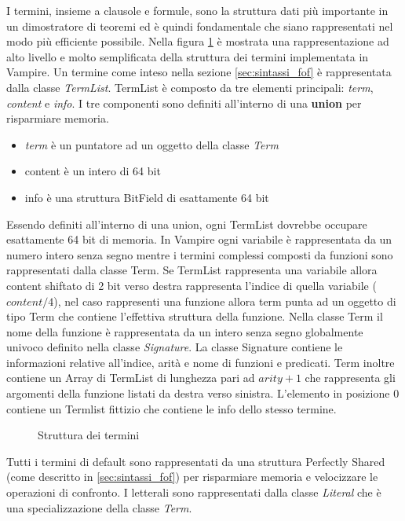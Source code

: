 \documentclass[./main.tex]{subfiles}
\begin{document}
I termini, insieme a clausole e formule, sono la struttura dati più importante in un dimostratore di teoremi ed è quindi fondamentale
che siano rappresentati nel modo più efficiente possibile. 
Nella figura \ref{fig:vampire_terms} è mostrata una rappresentazione ad alto 
livello e molto semplificata della struttura dei termini implementata in Vampire.
Un termine come inteso nella sezione \ref{sec:sintassi_fof} è rappresentata dalla classe \textit{TermList}.
TermList è composto da tre elementi principali: \textit{term}, \textit{content} e \textit{info}.
I tre componenti sono definiti all'interno di una \textbf{union} per risparmiare memoria.
\begin{itemize}
    \item \textit{term} è un puntatore ad un oggetto della classe \textit{Term}
    \item content è un intero di 64 bit
    \item info è una struttura BitField di esattamente 64 bit
\end{itemize}
Essendo definiti all'interno di una union, ogni TermList dovrebbe occupare esattamente 64 bit di memoria.
In Vampire ogni variabile è rappresentata da un numero intero senza segno mentre i termini complessi
composti da funzioni sono rappresentati dalla classe Term. 
Se TermList rappresenta una variabile allora content shiftato di 2 bit verso destra rappresenta l'indice di quella variabile ($content/4$),
nel caso rappresenti una funzione allora term punta ad un oggetto di tipo Term che contiene l'effettiva struttura della funzione.
Nella classe Term il nome della funzione è rappresentata da un intero senza segno globalmente univoco definito nella classe \textit{Signature}.
La classe Signature contiene le informazioni relative all'indice, arità e nome di funzioni e predicati. 
Term inoltre contiene un Array di TermList di lunghezza pari ad $arity+1$ che rappresenta gli argomenti della funzione listati 
da destra verso sinistra. L'elemento in posizione 0 contiene un Termlist fittizio che contiene le info dello stesso termine.
\begin{figure}[H]
    \centering
    \scalebox{0.55}{
        
    }
    \caption{Struttura dei termini}
    \label{fig:vampire_terms}
\end{figure}
Tutti i termini di default sono rappresentati da una struttura Perfectly Shared (come descritto in \ref{sec:sintassi_fof}) per 
risparmiare memoria e velocizzare le operazioni di confronto.
I letterali sono rappresentati dalla classe \textit{Literal} che è una specializzazione della classe \textit{Term}.
\end{document}
